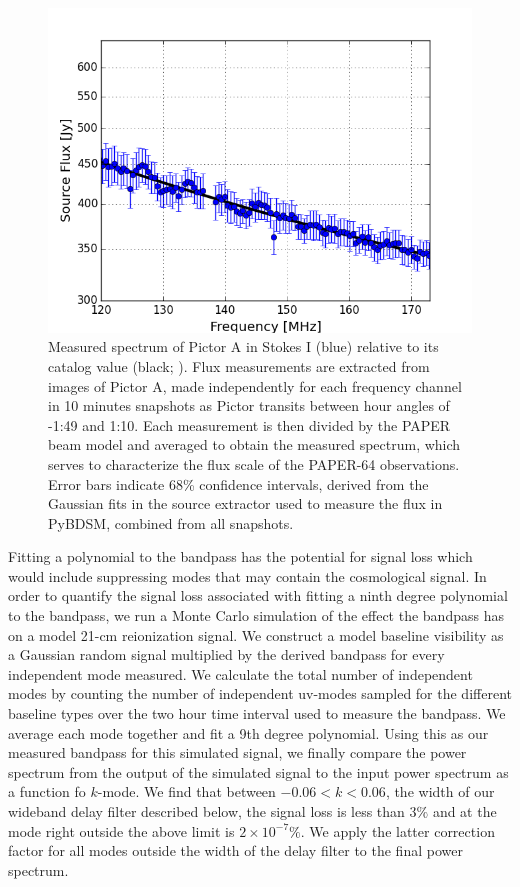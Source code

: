 \documentclass[twocolumn,numberedappendix]{emulateapj} \shorttitle{New Limits on the 21 cm Power Spectrum at $z=8.4$}
\begin{document}
\begin{figure}
\centering
\includegraphics[width=\columnwidth]{plots/picspec.png}
\caption{
Measured spectrum of Pictor A in Stokes I (blue) relative to its catalog
value (black; \citealt{jacobs_et_al2013}).  Flux measurements are
extracted from images of Pictor A, made independently for each frequency channel in
10 minutes snapshots as Pictor transits between hour angles of -1:49
and 1:10.  Each measurement is then divided by the PAPER beam model and
averaged to obtain the measured spectrum, which serves to characterize the flux
scale of the PAPER-64 observations. Error bars indicate 68\% confidence
intervals, derived from the Gaussian fits in the source extractor used to
measure the flux in PyBDSM, combined from all snapshots.
}\label{fig:pic_spec}
\end{figure}


Fitting a polynomial to the bandpass has the potential for signal loss which
would include suppressing modes that may contain the cosmological signal. In order to
quantify the signal loss associated with fitting a ninth degree polynomial to
the bandpass, we run a Monte Carlo simulation of the effect the bandpass has on
a model 21-cm reionization signal. We construct a model baseline visibility as a Gaussian
random signal 
multiplied by the derived bandpass for every independent mode measured. We
calculate the total number of independent modes by counting the number of
independent uv-modes sampled for the different baseline types over the two hour
time interval used to measure the bandpass. We average each mode together and
fit a 9th degree polynomial. Using this as our measured bandpass for this
simulated signal, we finally compare the power spectrum from the output of the
simulated signal to the input power spectrum as a function fo $k$-mode.  We
find that between $-0.06 < k < 0.06$, the width of our wideband delay filter
described below, the signal loss is less than $3\%$ and at the mode right
outside the above limit is $2\times{10^{-7}}\%$. We apply the latter correction
factor for all modes outside the width of the delay filter to the final power
spectrum.
\end{document}
